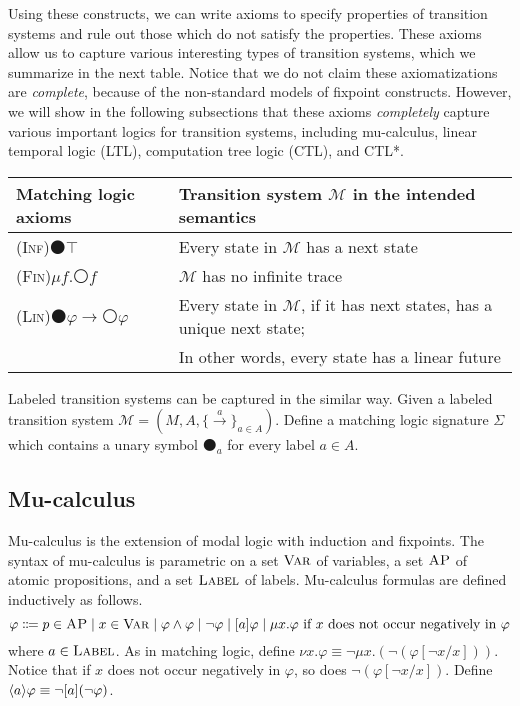 \documentclass[letter,12pt]{article}
\newcommand{\xtodo}[1]{\todo[inline]{(Xiaohong) #1}}
\newcommand{\imp}{\to}
\newcommand{\Var}{\textnormal{\textsc{Var}}}
\newcommand{\sig}{{\Sigma}}
\newcommand{\MM}{\mathcal{M}}
\newcommand{\prule}[1]{\textsc{(#1)}}
\newcommand{\AP}{\textsc{AP}}
\newcommand{\Label}{\textsc{Label}}
\newcommand{\wnext}{{\medcirc}}
\newcommand{\snext}{{\medbullet}}
\DeclarePairedDelimiter{\angleBraces}{\langle}{\rangle}
\newcommand{\Inf}{\prule{Inf}\xspace}
\newcommand{\Fin}{\prule{Fin}\xspace}
\newcommand{\Lin}{\prule{Lin}\xspace}
\newcommand{\xto}[1]{\xrightarrow{#1}}
\begin{document}
Using these constructs, we can write axioms to specify properties of transition systems
and rule out those which do not satisfy the properties.
These axioms allow us to capture various interesting types of transition systems,
which we summarize in the next table.
Notice that we do not claim these axiomatizations are \emph{complete},
because of the non-standard models of fixpoint constructs.
However, we will show in the following subsections that these axioms
\emph{completely} capture various important logics for transition systems,
including mu-calculus, linear temporal logic (LTL), computation tree logic (CTL), 
and CTL*.
\begin{center}
\begin{tabular}{ll}
Matching logic axioms & Transition system $\MM$ in the intended semantics
\\\hline
\Inf $\snext \top$ &
Every state in $\MM$ has a next state
\\
\Fin $\mu f . \wnext f$ &
$\MM$ has no infinite trace
\\
\Lin $\snext \varphi \imp \wnext \varphi$ &
Every state in $\MM$, if it has next states, has a unique next state;
\\& In other words, every state has a linear future
\end{tabular}
\end{center} 

Labeled transition systems can be captured in the similar way.
Given a labeled transition system $\MM = (M, A, \{ \xto{a} \}_{a \in A})$.
Define a matching logic signature $\sig$ which contains a unary symbol $\snext_a$
for every label $a \in A$.
\xtodo{Finish this section.}

\subsection{Mu-calculus}
\label{sec_mu_calculus}

Mu-calculus is the extension of modal logic with
induction and fixpoints.
The syntax of mu-calculus is parametric on a set $\Var$ of variables,
a set $\AP$ of atomic propositions,
and a set $\Label$ of labels.
Mu-calculus formulas are defined inductively as follows.
$$
\varphi \Coloneqq
p \in \AP \mid
x \in \Var \mid
\varphi \wedge \varphi \mid
\neg \varphi \mid 
[a] \varphi \mid
\mu x . \varphi \text{ if $x$ does not occur negatively in $\varphi$}
$$
where $a \in \Label$.
As in matching logic, define $\nu x . \varphi \equiv \neg \mu x . (\neg (\varphi[\neg x / x]))$.
Notice that if $x$ does not occur negatively in $\varphi$,
so does $\neg (\varphi[\neg x / x])$.
Define $\angleBraces{a} \varphi \equiv \neg [a] (\neg \varphi)$.
\end{document}
